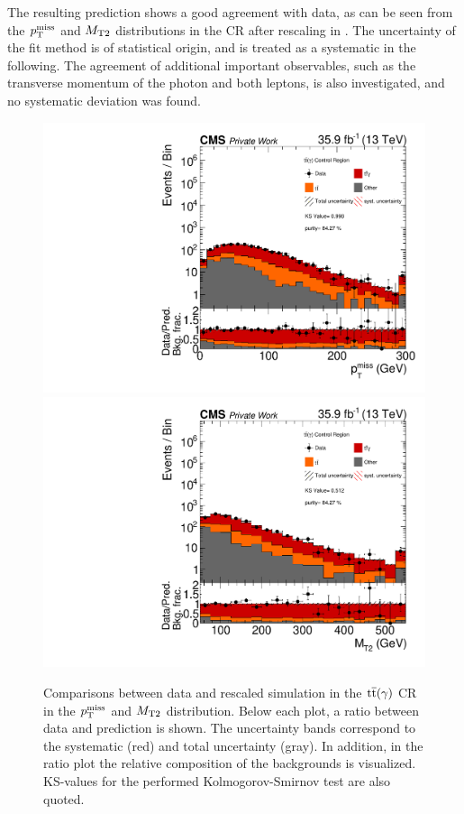 The resulting prediction shows a good agreement with data, as can be seen from the $p_{\mathrm{T}}^\text{miss}$ and $M_{\mathrm{T2}}$ distributions in the CR after rescaling in . The uncertainty of the fit method is of statistical origin, and is treated as a systematic in the following. The agreement of additional important observables, such as the transverse momentum of the photon and both leptons, is also investigated, and no systematic deviation was found.
\begin{figure}[tbp]
 \centering
 \includegraphics[width=\pairwidth]{figures/plots_CR_tt/CRTT_EM_nom_met_log}
 \includegraphics[width=\pairwidth]{figures/plots_CR_tt/CRTT_EM_nom_mt2_log}
 \caption{Comparisons between data and rescaled simulation in the ${\mathrm{t}\overline{\mathrm{t}}}(\gamma)$ CR in the $p_{\mathrm{T}}^\text{miss}$ and $M_{\mathrm{T2}}$ distribution. Below each plot, a ratio between data and prediction is shown. The uncertainty bands correspond to the systematic (red) and total uncertainty (gray). In addition, in the ratio plot the relative composition of the backgrounds is visualized. KS-values for the performed Kolmogorov-Smirnov test are also quoted.}
 \label{fig:CRTT}
\end{figure}
